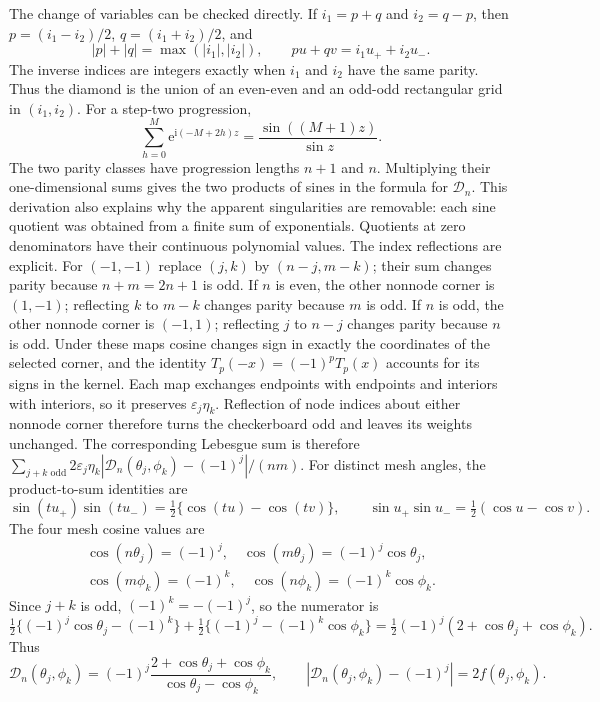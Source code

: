 The change of variables can be checked directly. If
$i_1=p+q$ and $i_2=q-p$, then
$p=(i_1-i_2)/2$, $q=(i_1+i_2)/2$, and
\[
 |p|+|q|=\max(|i_1|,|i_2|),\qquad pu+qv=i_1u_++i_2u_-.
\]
The inverse indices are integers exactly when $i_1$ and $i_2$ have the
same parity. Thus the diamond is the union of an even-even and an
odd-odd rectangular grid in $(i_1,i_2)$. For a step-two progression,
\[
 \sum_{h=0}^{M}\mathrm e^{\mathrm i(-M+2h)z}
       =\frac{\sin((M+1)z)}{\sin z}.
\]
The two parity classes have progression lengths $n+1$ and $n$.
Multiplying their one-dimensional sums gives the two products of
sines in the formula for $\mathcal{D}_n$. This derivation also explains why
the apparent singularities are removable: each sine quotient was
obtained from a finite sum of exponentials. Quotients at zero denominators have their
continuous polynomial values. The index reflections are explicit.
For $(-1,-1)$ replace $(j,k)$ by $(n-j,m-k)$; their sum changes
parity because $n+m=2n+1$ is odd. If $n$ is even, the other
nonnode corner is $(1,-1)$; reflecting $k$ to $m-k$ changes
parity because $m$ is odd. If $n$ is odd, the other nonnode
corner is $(-1,1)$; reflecting $j$ to $n-j$ changes parity
because $n$ is odd. Under these maps cosine changes sign in
exactly the coordinates of the selected corner, and the identity
$T_p(-x)=(-1)^pT_p(x)$ accounts for its signs in the kernel.
Each map exchanges endpoints with endpoints and interiors with
interiors, so it preserves $\varepsilon_j\eta_k$. Reflection
of node indices about either nonnode corner therefore turns the
checkerboard odd and leaves its weights unchanged.
The corresponding Lebesgue sum is therefore
$\sum_{j+k\text{ odd}}2\varepsilon_j\eta_k
 |\mathcal{D}_n(\theta_j,\phi_k)-(-1)^j|/(nm)$.
For distinct mesh angles, the product-to-sum identities are
\[
 \sin(tu_+)\sin(tu_-)=\tfrac12\{\cos(tu)-\cos(tv)\},
 \qquad \sin u_+\sin u_-=\tfrac12(\cos u-\cos v).
\]
The four mesh cosine values are
\[
 \begin{gathered}
 \cos(n\theta_j)=(-1)^j,\quad
 \cos(m\theta_j)=(-1)^j\cos\theta_j,\\
 \cos(m\phi_k)=(-1)^k,\quad
 \cos(n\phi_k)=(-1)^k\cos\phi_k.
 \end{gathered}
\]
Since $j+k$ is odd, $(-1)^k=-(-1)^j$, so the numerator is
\[
 \tfrac12\{(-1)^j\cos\theta_j-(-1)^k\}
 +\tfrac12\{(-1)^j-(-1)^k\cos\phi_k\}
 =\tfrac12(-1)^j(2+\cos\theta_j+\cos\phi_k).
\]
Thus
\[
 \mathcal{D}_n(\theta_j,\phi_k)=(-1)^j
       \frac{2+\cos\theta_j+\cos\phi_k}{\cos\theta_j-\cos\phi_k},
 \qquad |\mathcal{D}_n(\theta_j,\phi_k)-(-1)^j|=2f(\theta_j,\phi_k).
\]
